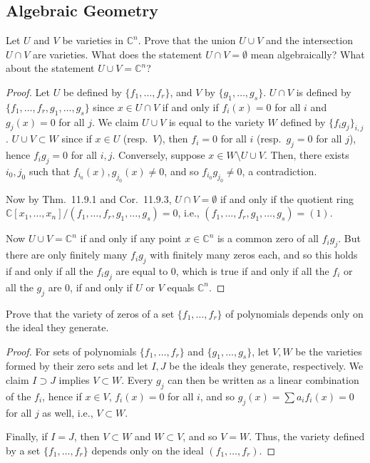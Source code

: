 \documentclass[12pt]{article}
\theoremstyle{remark}
\begin{document}
\subsection{Algebraic Geometry}
\setcounter{subsubsection}{3}
\begin{problem}\label{exc:11.9.4}
  Let $U$ and $V$ be varieties in $\mathbb{C}^n$. Prove that the union $U\cup V$ and the intersection $U\cap V$ are varieties. What does the statement $U\cap V=\emptyset$ mean algebraically? What about the statement $U\cup V=\mathbb{C}^n$?
\end{problem}
\begin{proof}
  Let $U$ be defined by $\{f_1,\ldots,f_r\}$, and $V$ by $\{g_1,\ldots,g_s\}$. $U \cap V$ is defined by $\{f_1,\ldots,f_r,g_1,\ldots,g_s\}$ since $x \in U \cap V$ if and only if $f_i(x) = 0$ for all $i$ and $g_j(x) = 0$ for all $j$. We claim $U \cup V$ is equal to the variety $W$ defined by $\{f_ig_j\}_{i,j}$. $U \cup V \subset W$ since if $x \in U$ (resp.~$V$), then $f_i = 0$ for all $i$ (resp.~$g_j = 0$ for all $j$), hence $f_ig_j = 0$ for all $i,j$. Conversely, suppose $x \in W \setminus U \cup V$. Then, there exists $i_0,j_0$ such that $f_{i_0}(x),g_{j_0}(x) \ne 0$, and so $f_{i_0}g_{j_0} \ne 0$, a contradiction.
  \par Now by Thm.~11.9.1 and Cor.~11.9.3, $U \cap V = \emptyset$ if and only if the quotient ring $\mathbb{C}[x_1,\ldots,x_n]/(f_1,\ldots,f_r,g_1,\ldots,g_s) = 0$, i.e., $(f_1,\ldots,f_r,g_1,\ldots,g_s) = (1)$.
  \par Now $U \cup V = \mathbb{C}^n$ if and only if any point $x \in \mathbb{C}^n$ is a common zero of all $f_ig_j$. But there are only finitely many $f_ig_j$ with finitely many zeros each, and so this holds if and only if all the $f_ig_j$ are equal to $0$, which is true if and only if all the $f_i$ or all the $g_j$ are $0$, if and only if $U$ or $V$ equals $\mathbb{C}^n$.
\end{proof}

\begin{problem}
  Prove that the variety of zeros of a set $\{f_1,\ldots,f_r\}$ of polynomials depends only on the ideal they generate.
\end{problem}
\begin{proof}
  For sets of polynomials $\{f_1,\ldots,f_r\}$ and $\{g_1,\ldots,g_s\}$, let $V,W$ be the varieties formed by their zero sets and let $I,J$ be the ideals they generate, respectively. We claim $I \supset J$ implies $V \subset W$. Every $g_j$ can then be written as a linear combination of the $f_i$, hence if $x \in V$, $f_i(x) = 0$ for all $i$, and so $g_j(x) = \sum a_if_i(x) = 0$ for all $j$ as well, i.e., $V \subset W$.
\par Finally, if $I = J$, then $V \subset W$ and $W \subset V$, and so $V = W$. Thus, the variety defined by a set $\{f_1,\ldots,f_r\}$ depends only on the ideal $(f_1,\ldots,f_r)$.
\end{proof}
\end{document}

